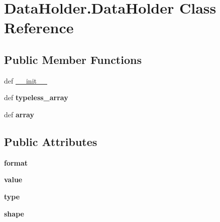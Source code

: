 \hypertarget{classDataHolder_1_1DataHolder}{
\section{DataHolder.DataHolder Class Reference}
\label{classDataHolder_1_1DataHolder}
}
\subsection*{Public Member Functions}
\begin{DoxyCompactItemize}
\item 
def \hyperlink{classDataHolder_1_1DataHolder_a64f447d8ccac8ace2848733b9fb271fb}{\_\-\_\-init\_\-\_\-}
\item 
\hypertarget{classDataHolder_1_1DataHolder_a9030ee5d9b65208cde2c9d4dbcdfc071}{
def {\bfseries typeless\_\-array}}
\label{classDataHolder_1_1DataHolder_a9030ee5d9b65208cde2c9d4dbcdfc071}

\item 
\hypertarget{classDataHolder_1_1DataHolder_ad72b520efcaaecf3547c3fc048ae2368}{
def {\bfseries array}}
\label{classDataHolder_1_1DataHolder_ad72b520efcaaecf3547c3fc048ae2368}

\end{DoxyCompactItemize}
\subsection*{Public Attributes}
\begin{DoxyCompactItemize}
\item 
\hypertarget{classDataHolder_1_1DataHolder_a5d8a011784ef6bc9073eb224b7ad1125}{
{\bfseries format}}
\label{classDataHolder_1_1DataHolder_a5d8a011784ef6bc9073eb224b7ad1125}

\item 
\hypertarget{classDataHolder_1_1DataHolder_a85d4f33dd7f9ab88a0e5e7eb28b778a2}{
{\bfseries value}}
\label{classDataHolder_1_1DataHolder_a85d4f33dd7f9ab88a0e5e7eb28b778a2}

\item 
\hypertarget{classDataHolder_1_1DataHolder_a0c5d66f0a4ace660e2c327f5f786bee2}{
{\bfseries type}}
\label{classDataHolder_1_1DataHolder_a0c5d66f0a4ace660e2c327f5f786bee2}

\item 
\hypertarget{classDataHolder_1_1DataHolder_abe8269dcf9d02dd26c96e7615b2227d4}{
{\bfseries shape}}
\label{classDataHolder_1_1DataHolder_abe8269dcf9d02dd26c96e7615b2227d4}

\end{DoxyCompactItemize}


